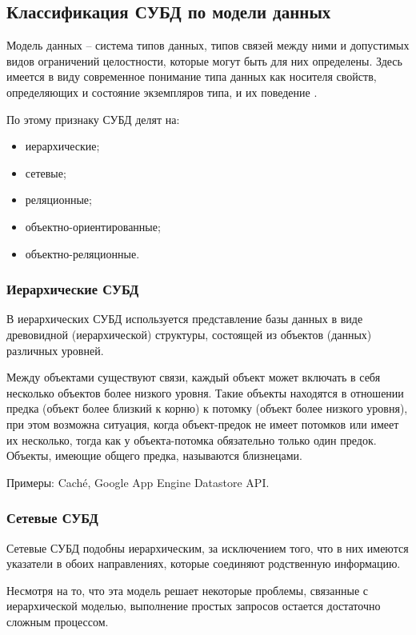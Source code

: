 \documentclass[a4paper,14pt]{extreport}
\begin{document}
\subsection{Классификация СУБД по модели данных}

Модель данных --  система типов данных, типов связей между ними и допустимых видов ограничений целостности, которые могут быть для них определены. Здесь имеется в виду современное понимание типа данных как носителя свойств, определяющих и состояние экземпляров типа, и их поведение \cite{kogal}.

По этому признаку СУБД делят на:

\begin{itemize}
	\setlength\itemsep{0.01em}
	\item иерархические;
	\item сетевые;
	\item реляционные;
	\item объектно-ориентированные;
	\item объектно-реляционные.
\end{itemize}

\subsubsection*{Иерархические СУБД}
В иерархических СУБД используется представление базы данных в виде древовидной (иерархической) структуры, состоящей из объектов (данных) различных уровней.

Между объектами существуют связи, каждый объект может включать в себя несколько объектов более низкого уровня. Такие объекты находятся в отношении предка (объект более близкий к корню) к потомку (объект более низкого уровня), при этом возможна ситуация, когда объект-предок не имеет потомков или имеет их несколько, тогда как у объекта-потомка обязательно только один предок. Объекты, имеющие общего предка, называются близнецами.

Примеры: Caché, Google App Engine Datastore API.

\subsubsection*{Сетевые СУБД}
Сетевые СУБД подобны иерархическим, за исключением того, что в них имеются указатели в обоих направлениях, которые соединяют родственную информацию.

Несмотря на то, что эта модель решает некоторые проблемы, связанные с иерархической моделью, выполнение простых запросов остается достаточно сложным процессом.
\end{document}
